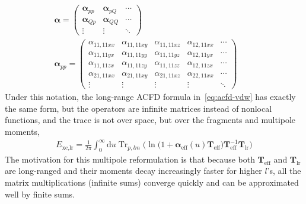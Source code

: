 \begin{equation}
\begin{gathered}
  \boldsymbol\alpha=\begin{pmatrix}
    \boldsymbol\alpha_{pp} & \boldsymbol\alpha_{pQ} & \cdots \\
    \boldsymbol\alpha_{Qp} & \boldsymbol\alpha_{QQ} & \cdots \\
    \vdots & \vdots & \ddots
  \end{pmatrix}\\
  \boldsymbol\alpha_{pp}=\begin{pmatrix}
    \alpha_{11,11xx} & \alpha_{11,11xy} & \alpha_{11,11xz} & \alpha_{12,11xx} & \cdots \\
    \alpha_{11,11yx} & \alpha_{11,11yy} & \alpha_{11,11yz} & \alpha_{12,11yx} & \cdots \\
    \alpha_{11,11zx} & \alpha_{11,11zy} & \alpha_{11,11zz} & \alpha_{12,11zx} & \cdots \\
    \alpha_{21,11xx} & \alpha_{21,11xy} & \alpha_{21,11xz} & \alpha_{22,11xx} & \cdots \\
    \vdots & \vdots & \vdots & \vdots & \ddots
  \end{pmatrix}\qquad
\end{gathered}
\end{equation}
Under this notation, the long-range ACFD formula in~\eqref{eq:acfd-vdw} has exactly the same form, but the operators are infinite matrices instead of nonlocal functions, and the trace is not over space, but over the fragments and multipole moments,
\begin{equation}
\begin{aligned}
  E_\text{xc,lr}=\frac1{2\pi}\int_0^\infty\mathrm du\operatorname{Tr}_{p,lm}\Big(\ln\big(1+\boldsymbol\alpha_\text{eff}(u)\mathbf T_\text{eff}\big)\mathbf T_\text{eff}^{-1}\mathbf T_\text{lr}\Big)
\end{aligned}
  \label{eq:acfd-cg}
\end{equation}
The motivation for this multipole reformulation is that because both $\mathbf T_\text{eff}$ and $\mathbf T_\text{lr}$ are long-ranged and their moments decay increasingly faster for higher $l$'s, all the matrix multiplications (infinite sums) converge quickly and can be approximated well by finite sums.

